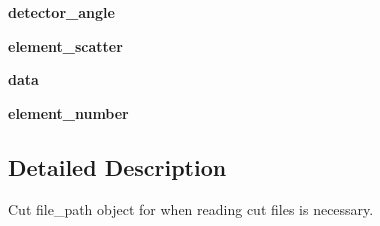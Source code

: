 \begin{DoxyCompactItemize}
\item 
\hypertarget{classModules_1_1CutFile_1_1CutFile_a9303581407c0166d7d560641fecdb5be}{{\bfseries detector\-\_\-angle}}\label{classModules_1_1CutFile_1_1CutFile_a9303581407c0166d7d560641fecdb5be}

\item 
\hypertarget{classModules_1_1CutFile_1_1CutFile_a853145c4268a367383beef002dded059}{{\bfseries element\-\_\-scatter}}\label{classModules_1_1CutFile_1_1CutFile_a853145c4268a367383beef002dded059}

\item 
\hypertarget{classModules_1_1CutFile_1_1CutFile_af06381681f43c69725fa30f1877f0492}{{\bfseries data}}\label{classModules_1_1CutFile_1_1CutFile_af06381681f43c69725fa30f1877f0492}

\item 
\hypertarget{classModules_1_1CutFile_1_1CutFile_ac26f41b6984a82b8d4fbe86ae11b9f65}{{\bfseries element\-\_\-number}}\label{classModules_1_1CutFile_1_1CutFile_ac26f41b6984a82b8d4fbe86ae11b9f65}

\end{DoxyCompactItemize}


\subsection{Detailed Description}
\begin{DoxyVerb}Cut file_path object for when reading cut files is necessary.
\end{DoxyVerb}
 

